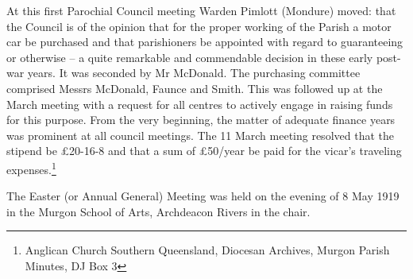 At this first Parochial Council meeting Warden Pimlott (Mondure) moved:
that the Council is of the opinion that for the proper working of the
Parish a motor car be purchased and that parishioners be appointed with
regard to guaranteeing or otherwise -- a quite remarkable and
commendable decision in these early post-war years. It was seconded by
Mr McDonald. The purchasing committee comprised Messrs McDonald, Faunce
and Smith. This was followed up at the March meeting with a request for
all centres to actively engage in raising funds for this purpose. From
the very beginning, the matter of adequate finance years was prominent
at all council meetings. The 11 March meeting resolved that the stipend
be £20-16-8 and that a sum of £50/year be paid for the vicar's traveling
expenses.\footnote{Anglican Church Southern Queensland, Diocesan
  Archives, Murgon Parish Minutes, DJ Box 3}

The Easter (or Annual General) Meeting was held on the evening of 8 May
1919 in the Murgon School of Arts, Archdeacon Rivers in the chair.

